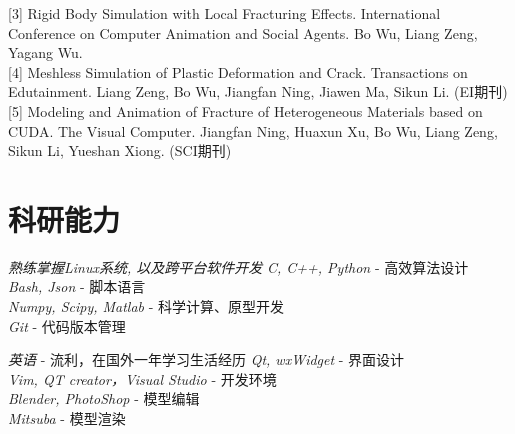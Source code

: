 \documentclass[20pt]{article} %
\begin{document}
[3] {Rigid Body Simulation with Local Fracturing Effects}. International
Conference on Computer Animation and Social Agents. Bo Wu, Liang Zeng, Yagang
Wu.\\

[4] {Meshless Simulation of Plastic Deformation and Crack}. Transactions on
Edutainment. Liang Zeng, Bo Wu, Jiangfan Ning, Jiawen Ma, Sikun Li. (EI期刊) \\

[5] {Modeling and Animation of Fracture of Heterogeneous Materials based on
CUDA}. The Visual Computer. Jiangfan Ning, Huaxun Xu, Bo Wu, Liang Zeng, Sikun
Li, Yueshan Xiong. (SCI期刊)



%
%
%

\section{科研能力}

\begin{minipage}{0.5\textwidth}
\centering
{}
{
\textit{熟练掌握Linux系统, 以及跨平台软件开发}
}
{
\textit{C, C++, Python} - 高效算法设计\\
\textit{Bash, Json} - 脚本语言\\
\textit{Numpy, Scipy, Matlab} - 科学计算、原型开发\\
\textit{Git} - 代码版本管理
}
\end{minipage}
\begin{minipage}{0.5\textwidth}
{
\textit{英语} - 流利，在国外一年学习生活经历
}
{
\textit{Qt, wxWidget} - 界面设计\\
\textit{Vim, QT creator，Visual Studio} - 开发环境\\
\textit{Blender, PhotoShop} - 模型编辑\\
\textit{Mitsuba} - 模型渲染
}
\end{minipage}
\end{document}
